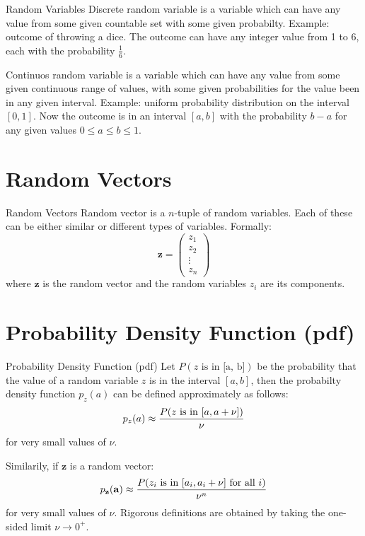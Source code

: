 \documentclass{beamer}
\begin{document}
\begin{frame}{Random Variables}
 Discrete random variable is a variable which can have any value from some given
 countable set with some given probabilty. Example: outcome of throwing a dice.
 The outcome can have any integer value from 1 to 6, each with the probability
 $\frac{1}{6}$.

 Continuos random variable is a variable which can have any value from some given
 continuous range of values, with some given probabilities for the value been in
 any given interval. Example: uniform probability distribution on the interval
 $[0, 1]$. Now the outcome is in an interval $[a, b]$ with the probability $b-a$
 for any given values $0 \le a \le b \le 1$.
\end{frame}

\section{Random Vectors}

\begin{frame}{Random Vectors}
  Random vector is a $n$-tuple of random variables. Each of these can be either
  similar or different types of variables. Formally:
  \[ \mathbf{z} =  \begin{pmatrix} z_1 \\ z_2 \\ \vdots \\ z_n \end{pmatrix} \]
  where $\mathbf{z}$ is the random vector and the random variables $z_i$ are
  its components.
\end{frame}

\section{Probability Density Function (pdf)}

\begin{frame}{Probability Density Function (pdf)}
  Let $P(\text{$z$ is in [a, b]})$ be the probability that the value of a
  random variable $z$ is in the interval $[a, b]$, then the probabilty density
  function $p_z(a)$ can be defined approximately as follows:
  \[ p_z(a) \approx \frac{P(\textnormal{$z$ is in $[a, a + \nu]$})}{\nu}\]
  for very small values of $\nu$.

  Similarily, if $\mathbf{z}$ is a random vector:
  \[ p_{\mathbf{z}}(\mathbf{a}) \approx
  \frac{P(\textnormal{$z_i$ is in $[a_i, a_i + \nu]$ for all $i$})}{\nu^n}\]
  for very small values of $\nu$. Rigorous definitions are obtained by taking
  the one-sided limit $\nu \to 0^+$.
\end{frame}
\end{document}
